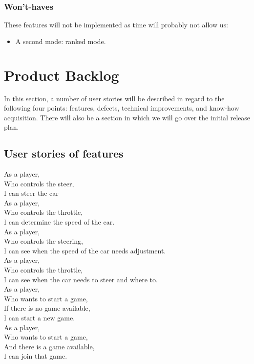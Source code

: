 \documentclass[11pt,twoside,a4paper]{article}
\begin{document}
\subsubsection{Won't-haves}
These features will not be implemented as time will probably not allow us:

\begin{itemize}
  \item A second mode: ranked mode.
\end{itemize}


\section{Product Backlog}
In this section, a number of user stories will be described in regard to the following four points: features, defects, technical improvements, and know-how acquisition. There will also be a section in which we will go over the initial release plan.


\subsection{User stories of features}
As a player,\\
Who controls the steer,\\
I can steer the car\\

As a player,\\
Who controls the throttle,\\
I can determine the speed of the car.\\

As a player,\\
Who controls the steering,\\
I can see when the speed of the car needs adjustment.\\

As a player,\\
Who controls the throttle,\\
I can see when the car needs to steer and where to.\\

As a player,\\
Who wants to start a game,\\
If there is no game available,\\
I can start a new game.\\

As a player,\\
Who wants to start a game,\\
And there is a game available,\\
I can join that game.\\
\end{document}
